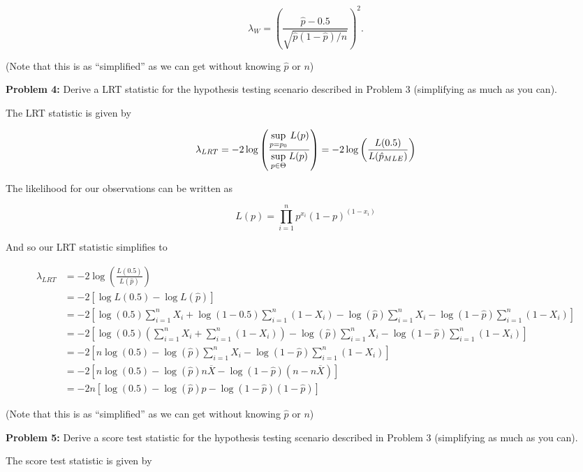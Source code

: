\documentclass[
  letterpaper,
  DIV=11,
  numbers=noendperiod]{scrreprt}
\begin{document}
\[
\lambda_W = \left( \frac{\hat{p} - 0.5}{\sqrt{\hat{p}(1 - \hat{p})/n}}\right)^2.
\]

(Note that this is as ``simplified'' as we can get without knowing
\(\hat{p}\) or \(n\))

\textbf{Problem 4:} Derive a LRT statistic for the hypothesis testing
scenario described in Problem 3 (simplifying as much as you can).

The LRT statistic is given by

\[
\lambda_{LRT} = -2 \log\left(\frac{\underset{p = p_0}{\text{sup}} \hspace{1mm} L(p)}{\underset{p \in \Theta}{\text{sup}} \hspace{1mm} L(p)} \right)= -2 \log\left(\frac{ L(0.5)} {L(\hat{p}_{MLE})} \right)
\]

The likelihood for our observations can be written as

\[
L(p) = \prod_{i = 1}^n p^{x_i} (1 - p)^{(1 - x_i)}
\]

And so our LRT statistic simplifies to

\begin{align*}
\lambda_{LRT} & = -2 \log\left(\frac{ L(0.5)} {L(\hat{p})} \right) \\
& = -2 \left[\log L(0.5) - \log L(\hat{p}) \right] \\
& = -2 \left[ \log(0.5) \sum_{i = 1}^n X_i + \log(1 - 0.5)\sum_{i = 1}^n(1 - X_i) - \log(\hat{p}) \sum_{i = 1}^n X_i - \log(1 - \hat{p})\sum_{i = 1}^n(1 - X_i)\right] \\
& = -2 \left[ \log(0.5) \left( \sum_{i = 1}^n X_i + \sum_{i = 1}^n(1 - X_i)\right) - \log(\hat{p}) \sum_{i = 1}^n X_i - \log(1 - \hat{p})\sum_{i = 1}^n(1 - X_i)\right] \\
& = -2 \left[ n\log(0.5) - \log(\hat{p}) \sum_{i = 1}^n X_i - \log(1 - \hat{p})\sum_{i = 1}^n(1 - X_i)\right] \\
& = -2 \left[ n\log(0.5) - \log(\hat{p}) n \overline{X} - \log(1 - \hat{p}) (n - n \overline{X})\right] \\
& = -2 n \left[ \log(0.5) - \log(\hat{p}) \hat{p} - \log(1 - \hat{p}) (1 -  \hat{p})\right]
\end{align*}

(Note that this is as ``simplified'' as we can get without knowing
\(\hat{p}\) or \(n\))

\textbf{Problem 5:} Derive a score test statistic for the hypothesis
testing scenario described in Problem 3 (simplifying as much as you
can).

The score test statistic is given by
\end{document}
